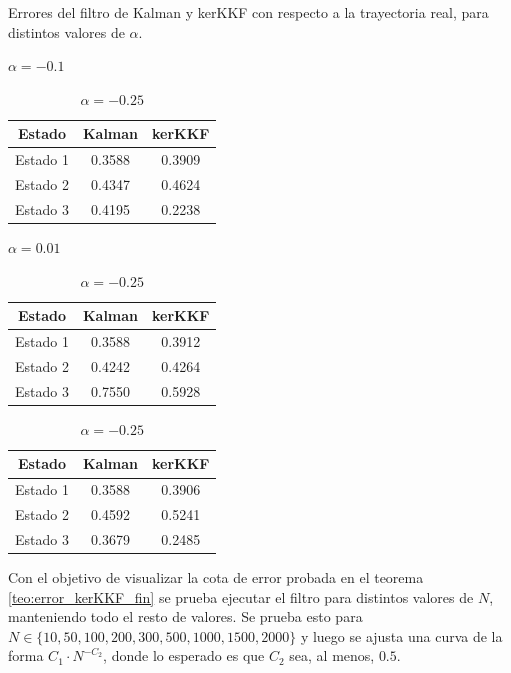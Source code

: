 \begin{table}[h]
    \caption{Errores del filtro de Kalman y kerKKF con respecto a la trayectoria real, para distintos valores de $\alpha$.}
    \begin{subtable}{.49\linewidth}
        \centering
    \caption{$\alpha = -0.1$}
    \begin{tabular}{|c|c|c|}
    \hline
    \textbf{Estado} & \textbf{Kalman} & \textbf{kerKKF} \\ \hline
    Estado 1 & 0.3588 & 0.3909 \\ \hline
    Estado 2 & 0.4347 & 0.4624 \\ \hline
    Estado 3 & 0.4195 & 0.2238 \\ \hline
    \end{tabular}
    \label{tab:errores_alpha_01}
    \end{subtable}
    \begin{subtable}{.49\linewidth}
        \centering
    \caption{$\alpha = 0.01$}
    \begin{tabular}{|c|c|c|}
    \hline
    \textbf{Estado} & \textbf{Kalman} & \textbf{kerKKF} \\ \hline
    Estado 1 & 0.3588 & 0.3912 \\ \hline
    Estado 2 & 0.4242 & 0.4264 \\ \hline
    Estado 3 & 0.7550 & 0.5928 \\ \hline
    \end{tabular}
    \label{tab:errores_alpha_001}
    \end{subtable}
    \begin{subtable}{\linewidth}
        \centering
        \caption{$\alpha = -0.25$}
        \begin{tabular}{|c|c|c|}
        \hline
        \textbf{Estado} & \textbf{Kalman} & \textbf{kerKKF} \\ \hline
        Estado 1 & 0.3588 & 0.3906 \\ \hline
        Estado 2 & 0.4592 & 0.5241 \\ \hline
        Estado 3 & 0.3679 & 0.2485 \\ \hline
        \end{tabular}
        \label{tab:errores_alpha_m025}
            \end{subtable}
\end{table}

Con el objetivo de visualizar la cota de error probada en el teorema \ref{teo:error_kerKKF_fin} se prueba ejecutar el filtro para distintos valores de $N$, manteniendo todo el resto de valores. Se prueba esto para $N \in \{10, 50, 100, 200, 300, 500, 1000, 1500, 2000\}$ y luego se ajusta una curva de la forma $C_1 \cdot N ^{-C_2}$, donde lo esperado es que $C_2$ sea, al menos, $0.5$.

